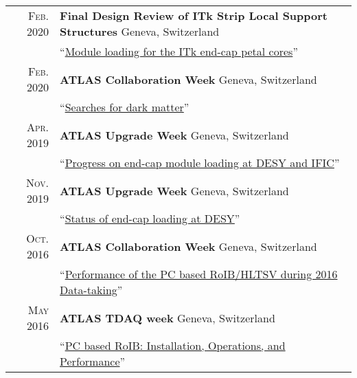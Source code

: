 \documentclass[a4paper,10pt]{article}
\begin{document}
\begin{tabular}{rp{15.5cm}}
\textsc{Feb. 2020}		& {\bf Final Design Review of ITk Strip Local Support Structures} \hfill Geneva, Switzerland\\
						& ``\href{https://indico.cern.ch/event/872236/#12-module-loading-petals}{Module loading for the ITk end-cap petal cores}''  	\\
\textsc{Feb. 2020}		& {\bf ATLAS Collaboration Week} \hfill Geneva, Switzerland\\
						& ``\href{ https://indico.cern.ch/event/868980/contributions/3663511/}{Searches for dark matter}''  	\\
\textsc{Apr. 2019}		& {\bf ATLAS Upgrade Week} \hfill Geneva, Switzerland\\
						& ``\href{https://indico.cern.ch/event/806682/#4-progress-on-ec-module-loadin}{Progress on end-cap module loading at DESY and IFIC}''  	\\
\textsc{Nov. 2019}		& {\bf ATLAS Upgrade Week} \hfill Geneva, Switzerland\\
						& ``\href{https://indico.cern.ch/event/858220/#1-status-of-endcap-loading-sit}{Status of end-cap loading at DESY}''  	\\
\textsc{Oct. 2016}		& {\bf ATLAS Collaboration Week} \hfill Geneva, Switzerland\\
						& ``\href{https://indico.cern.ch/event/577349/}{Performance of the PC based RoIB/HLTSV during 2016 Data-taking}''  	\\
\textsc{May 2016}		& {\bf ATLAS TDAQ week} \hfill Geneva, Switzerland\\
						& ``\href{https://indico.cern.ch/event/464852/}{PC based RoIB: Installation, Operations, and Performance}''  	\\
\end{tabular}
\end{document}
